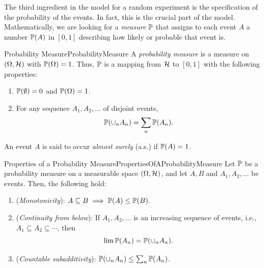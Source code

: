The third ingredient in the model for a random experiment is the specification of the probability of the events. In fact, this is the crucial part of the model. Mathematically, we are looking for a \textit{measure} \(\mathbb{P}\) that assigns to each event \(A\) a number \(\mathbb{P}(A)\) in \([0, 1]\) describing how likely or probable that event is.

\begin{defn}{Probability Measure}{ProbabilityMeasure}
	A \textit{probability measure} is a measure on \((\Omega, \mathcal{H})\) with \(\mathbb{P}(\Omega) = 1\). Thus, \(\mathbb{P}\) is a mapping from \(\mathcal{H}\) to \([0, 1]\) with the following properties:
	\begin{enumerate}
		\item \(\mathbb{P}(\emptyset) = 0\) and \(\mathbb{P}(\Omega) = 1\).
		\item For any sequence \(A_1, A_2, \dots\) of disjoint events,
		      \begin{equation}
			      \mathbb{P}(\cup_n A_n) = \sum_n \mathbb{P}(A_n).
			      \label{eq:ProbabilityMeasureDef}
		      \end{equation}
	\end{enumerate}
\end{defn}

An event \(A\) is said to occur \textit{almost surely} (a.s.) if \(\mathbb{P}(A) = 1\).

\begin{thm}{Properties of a Probability Measure}{PropertiesOfAProbabilityMeasure}
	Let \(\mathbb{P}\) be a probability measure on a measurable space \((\Omega, \mathcal{H})\), and let \(A, B\) and \(A_1, A_2, \dots\) be events. Then, the following hold:
	\begin{enumerate}
		\item (\textit{Monotonicity}): \(A \subseteq B \implies \mathbb{P}(A) \le \mathbb{P}(B)\).
		\item (\textit{Continuity from below}): If \(A_1, A_2, \dots\) is an increasing sequence of events, i.e., \(A_1 \subseteq A_2 \subseteq \cdots\), then
		      \begin{equation}
			      \lim \mathbb{P}(A_n) = \mathbb{P}(\cup_n A_n).
			      \label{eq:ContinuityFromBelow}
		      \end{equation}
		\item (\textit{Countable subadditivity}): \(\mathbb{P}(\cup_n A_n) \le \sum_n \mathbb{P}(A_n)\).
	\end{enumerate}
\end{thm}

